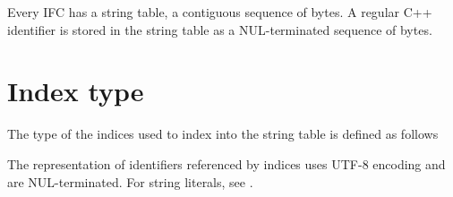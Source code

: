 \label{sec:ifc-string-table}

Every IFC has a string table, a contiguous sequence of bytes.   A regular C++ identifier is stored in the string table as
a NUL-terminated sequence of bytes.

\section{Index type}
\label{sec:ifc-textoffset-data-type}

The type of the indices used to index into the  string table is defined as follows 

The representation of identifiers  referenced by  indices  uses UTF-8 encoding and are NUL-terminated. 
 For string literals, see .
